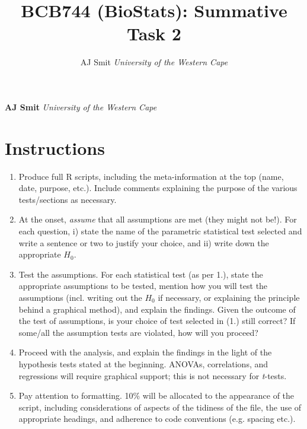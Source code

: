 \documentclass[10pt,a4,]{article}
\title{BCB744 (BioStats): Summative Task 2  }
\author{\Large AJ
Smit\vspace{0.05in} \newline\normalsize\emph{University of the Western
Cape}  }
\date{}
\newcommand*{\authorfont}{\fontfamily{phv}\selectfont}
\begin{document}

{%
\setlength{\parindent}{0pt}
\thispagestyle{plain}
{\fontsize{18}{20}\selectfont\raggedright
\maketitle  %
}
{
   \vskip 13.5pt\relax \normalsize\fontsize{11}{12}
\textbf{\authorfont AJ Smit} \hskip 15pt \emph{\small University of the
Western Cape}   
}
}



\vskip 6.5pt

\noindent 

\section*{Instructions}

\begin{enumerate}
\item Produce full R scripts, including the meta-information at the top (name, date, purpose, etc.). Include comments explaining the purpose of the various tests/sections as necessary.
\item At the onset, \emph{assume} that all assumptions are met (they might not be!). For each question, i) state the name of the parametric statistical test selected and write a sentence or two to justify your choice, and ii) write down the appropriate $H_{0}$.
\item Test the assumptions. For each statistical test (as per 1.), state the appropriate assumptions to be tested, mention how you will test the assumptions (incl. writing out the $H_{0}$ if necessary, or explaining the principle behind a graphical method), and explain the findings. Given the outcome of the test of assumptions, is your choice of test selected in (1.) still correct? If some/all the assumption tests are violated, how will you proceed? 
\item Proceed with the analysis, and explain the findings in the light of the hypothesis tests stated at the beginning. ANOVAs, correlations, and regressions will require graphical support; this is not necessary for \emph{t}-tests.
\item Pay attention to formatting. 10\% will be allocated to the appearance of the script, including considerations of aspects of the tidiness of the file, the use of appropriate headings, and adherence to code conventions (e.g. spacing etc.).
\end{enumerate}
\end{document}
